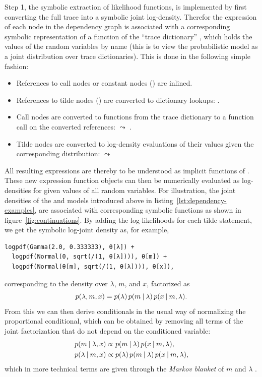 Step 1, the symbolic extraction of likelihood functions, is implemented by first converting the full
trace into a symbolic joint log-density.  Therefor the expression of each node in the dependency
graph is associated with a corresponding symbolic representation of a function of the \enquote{trace
  dictionary} , which holds the values of the random variables by name (this is to view the
probabilistic model as a joint distribution over trace dictionaries).  This is done in the following
simple fashion:
\begin{itemize}
  \firmlist
\item References to call nodes or constant nodes () are inlined.
\item References to tilde nodes () are converted to dictionary lookups: .
\item Call nodes are converted to functions from the trace dictionary to a
  function call on the converted references:  \(\leadsto\) .
\item Tilde nodes are converted to log-density evaluations of their values given the corresponding
  distribution:  \(\leadsto\) 
\end{itemize}
All resulting expressions are thereby to be understood as implicit functions of .  These
new expression function objects can then be numerically evaluated as log-densities for given values
of all random variables.  For illustration, the joint densities of the  and
 models introduced above in listing~\ref{lst:dependency-examples}, are
associated with corresponding symbolic functions as shown in figure~\ref{fig:continuations}.  By adding the log-likelihoods for each tilde statement, we get the symbolic
log-joint density as, for example,
\begin{lstlisting}
logpdf(Gamma(2.0, 0.333333), θ[λ]) + 
  logpdf(Normal(0, sqrt(/(1, θ[λ]))), θ[m]) + 
  logpdf(Normal(θ[m], sqrt(/(1, θ[λ]))), θ[x]),
\end{lstlisting}
corresponding to the density over \(\lambda\), \(m\), and \(x\), factorized as
\begin{equation}
  p(\lambda, m, x) = p(\lambda) \, p(m \:\vert\: \lambda) \, p(x \:\vert\: m, \lambda).
\end{equation}
From this we can then derive conditionals in the usual way of normalizing the proportional
conditional, which can be obtained by removing all terms of the joint factorization that do not
depend on the conditioned variable:
\begin{equation}
  \begin{aligned}
    p(m \:\vert\: \lambda, x) &\propto p(m \:\vert\: \lambda) \, p(x \:\vert\: m, \lambda), \\
    p(\lambda \:\vert\: m, x) &\propto p(\lambda) \, p(m \:\vert\: \lambda) \, p(x \:\vert\: m, \lambda),
  \end{aligned}
\end{equation}
which in more technical terms are given through the \emph{Markov blanket} of \(m\) and \(\lambda\)
\parencites[section 24.2]{murphy2012machine}[section 4.5]{koller2009probabilistic}.

